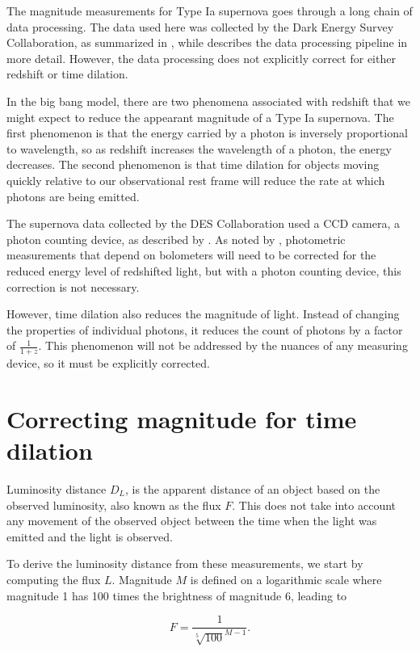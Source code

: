 \documentclass{article}
\begin{document}
The magnitude measurements for Type Ia supernova goes through a long chain of
data processing. The data used here was collected by the Dark Energy Survey
Collaboration, as summarized in \citet{abbott2024}, while \citet{vincenzi2024}
describes the data processing pipeline in more detail. However, the data
processing does not explicitly correct for either redshift or time dilation.

In the big bang model, there are two phenomena associated with redshift that we
might expect to reduce the appearant magnitude of a Type Ia supernova. The
first phenomenon is that the energy carried by a photon is inversely
proportional to wavelength, so as redshift increases the wavelength of a
photon, the energy decreases. The second phenomenon is that time dilation for
objects moving quickly relative to our observational rest frame will reduce the
rate at which photons are being emitted.

The supernova data collected by the DES Collaboration used a CCD camera, a
photon counting device, as described by \citet{flaughter2015}.  As noted by
\citet{kim1996}, photometric measurements that depend on bolometers will need
to be corrected for the reduced energy level of redshifted light, but with a
photon counting device, this correction is not necessary.

However, time dilation also reduces the magnitude of light. Instead of changing
the properties of individual photons, it reduces the count of photons by a
factor of $\frac{1}{1+z}$. This phenomenon will not be addressed by the nuances
of any measuring device, so it must be explicitly corrected.

\section{Correcting magnitude for time dilation}



Luminosity distance $D_L$, is the apparent distance of an object based on the
observed luminosity, also known as the flux $F$. This does not take into
account any movement of the observed object between the time when the light was
emitted and the light is observed.

To derive the luminosity distance from these measurements, we start
by computing the flux $L$. Magnitude $M$ is defined on a logarithmic scale
where magnitude 1 has 100 times the brightness of magnitude 6, leading to

\begin{equation}
  F = \frac{1}{\sqrt[5]{100}^{M - 1}}.
\end{equation}
\end{document}
